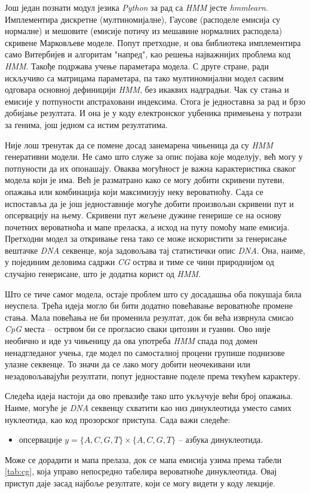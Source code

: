 \documentclass[12pt,oneside]{memoir}
\begin{document}
\begin{CJK}{UTF8}{ipxm}
Још један познати модул језика \textit{Python} за рад са \textit{HMM} јесте \textit{hmmlearn}\cite{lee2021}. Имплементира дискретне (мултиномијалне), Гаусове (расподеле емисија су нормалне) и мешовите (емисије потичу из мешавине нормалних расподела) скривене Марковљеве моделе. Попут претходне, и ова библиотека имплементира само Витербијев и алгоритам "напред", као решења најважнијих проблема код \textit{HMM}. Такође подржава учење параметара модела. С друге стране, ради искључиво са матрицама параметара, па тако мултиномијални модел сасвим одговара основној дефиницији \textit{HMM}, без икаквих надградњи. Чак су стања и емисије у потпуности апстраховани индексима. Стога је једноставна за рад и брзо добијање резултата. И она је у коду електронског уџбеника примењена у потрази за генима, још једном са истим резултатима.

Није лош тренутак да се помене досад занемарена чињеница да су \textit{HMM} генеративни модели. Не само што служе за опис појава које моделују, већ могу у потпуности да их опонашају. Оваква могућност је важна карактеристика сваког модела који је има. Већ је разматрано како се могу добити скривени путеви, опажања или комбинација који максимизују неку вероватноћу. Сада се испоставља да је још једноставније могуће добити произвољан скривени пут и опсервацију на њему. Скривени пут жељене дужине генерише се на основу почетних вероватноћа и мапе преласка, а исход на путу помоћу мапе емисија. Претходни модел за откривање гена тако се може искористити за генерисање вештачке \textit{DNA} секвенце, која задовољава тај статистички опис \textit{DNA}. Она, наиме, у појединим деловима садржи \textit{CG} острва и тиме се чини природнијом од случајно генерисане, што је додатна корист од \textit{HMM}.

Што се тиче самог модела, остаје проблем што су досадашња оба покушаја била неуспела. Трећа идеја могло би бити додатно повећавање вероватноће промене стања. Мала повећања не би променила резултат, док би већа изврнула смисао \textit{CpG} места -- острвом би се прогласио сваки цитозин и гуанин. Ово није необично и иде уз чињеницу да ова употреба \textit{HMM} спада под домен ненадгледаног учења, где модел по самосталној процени групише поднизове улазне секвенце. То значи да се лако могу добити неочекивани или незадовољавајући резултати, попут једноставне поделе према текућем карактеру.

Следећа идеја настоји да ово превазиђе тако што укључује већи број опажања. Наиме, могуће је \textit{DNA} секвенцу схватити као низ динуклеотида уместо самих нуклеотида, као код прозорског приступа. Сада важи следеће:
\begin{itemize}
  \item опсервације $y = \{A, C, G, T\} \times \{A, C, G, T\}$ -- азбука динуклеотида.
\end{itemize}
Може се дорадити и мапа прелаза, док се мапа емисија узима према табели \ref{tab:cg}, која управо непосредно табелира вероватноће динуклеотида. Овај приступ даје засад најбоље резултате, који се могу видети у коду лекције.


\end{CJK}
\end{document}
